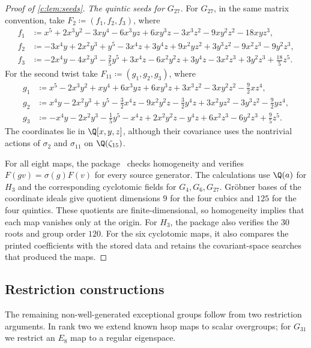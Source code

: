 \documentclass[11pt]{amsart}
\newcommand{\defeq}{\coloneqq}
\theoremstyle{definition}
\begin{document}
\begin{proof}[Proof of \cref{c:lem:seeds}]
\emph{The quintic seeds for $G_{27}$.}\label{sec:g27-seeds}
For $G_{27}$, in the same matrix convention, take
$F_2\defeq(f_1,f_2,f_3)$, where
\begin{align*}
 f_1&\defeq x^5+2x^3y^2-3xy^4-6x^3yz+6xy^3z
          -3x^3z^2-9xy^2z^2-18xyz^3,\\
 f_2&\defeq -3x^4y+2x^2y^3+y^5-3x^4z+3y^4z
          +9x^2yz^2+3y^3z^2-9x^2z^3-9y^2z^3,\\
 f_3&\defeq -2x^4y-4x^2y^3-\tfrac25y^5+3x^4z-6x^2y^2z+3y^4z
          -3x^2z^3+3y^2z^3+\tfrac{18}5z^5.
\end{align*}
For the second twist take $F_{11}\defeq(g_1,g_2,g_3)$, where
\begin{align*}
 g_1&\defeq x^5-2x^3y^2+xy^4+6x^3yz+6xy^3z
          +3x^3z^2-3xy^2z^2-\tfrac92xz^4,\\
 g_2&\defeq x^4y-2x^2y^3+y^5-\tfrac32x^4z-9x^2y^2z-\tfrac32y^4z
          +3x^2yz^2-3y^3z^2-\tfrac92yz^4,\\
 g_3&\defeq -x^4y-2x^2y^3-\tfrac15y^5-x^4z+2x^2y^2z-y^4z
          +6x^2z^3-6y^2z^3+\tfrac95z^5.
\end{align*}
The coordinates lie in $\Q[x,y,z]$, although their covariance uses
the nontrivial actions of $\sigma_2$ and $\sigma_{11}$ on
$\Q(\zeta_{15})$.

For all eight maps, the package~\cite{Computations} checks homogeneity
and verifies $F(gv)=\sigma(g)F(v)$ for every source generator. The calculations use
$\Q(a)$ for $H_3$ and the corresponding cyclotomic fields for
$G_4,G_6,G_{27}$. Gr\"obner bases of the coordinate ideals give
quotient dimensions $9$ for the four cubics and $125$ for the four
quintics. These quotients are finite-dimensional, so homogeneity
implies that each map vanishes only at the origin. For $H_3$, the
package also verifies the $30$ roots and group order $120$.
For the six cyclotomic maps, it also compares the printed coefficients
with the stored data and retains the covariant-space searches that
produced the maps.
\end{proof}

\subsection{Restriction constructions}\label{c:sec:restrictions}

The remaining non-well-generated exceptional groups follow from
two restriction arguments. In rank two we extend known hsop maps
to scalar overgroups; for $G_{31}$ we restrict an $E_8$ map to a
regular eigenspace.
\end{document}
